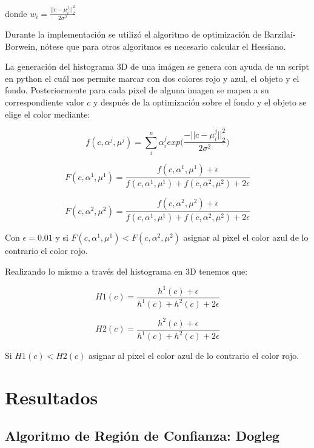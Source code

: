 \documentclass[conference]{IEEEtran}
\begin{document}
donde $w_i = \frac{||c - \mu_i^j||_2^2}{2\sigma^2}$

Durante la implementación se utilizó el algoritmo de optimización de Barzilai-Borwein, nótese que
para otros algoritmos es necesario calcular el Hessiano.

La generación del histograma 3D de una imágen se genera con ayuda de un script en python el cuál nos
permite marcar con dos colores rojo y azul, el objeto y el fondo. Posteriormente para cada pixel de
alguna imagen se mapea a su correspondiente valor $c$ y después de la optimización sobre el fondo y
el objeto se elige el color mediante:

\begin{equation*}
	f(c, \alpha^j, \mu^j) = \sum_i^n \alpha_i^j exp\big( \frac{-||c - \mu_i^j||_2^2}{2\sigma^2} \big)
\end{equation*}

\begin{equation*}
	F(c, \alpha^1, \mu^1) = \frac{f(c, \alpha^1, \mu^1) + \epsilon}
	{f(c, \alpha^1, \mu^1) + f(c, \alpha^2, \mu^2) + 2 \epsilon}
\end{equation*}

\begin{equation*}
	F(c, \alpha^2, \mu^2) = \frac{f(c, \alpha^2, \mu^2) + \epsilon}
	{f(c, \alpha^1, \mu^1) + f(c, \alpha^2, \mu^2) + 2 \epsilon}
\end{equation*}

Con $\epsilon = 0.01$ y si $F(c, \alpha^1, \mu^1) < F(c, \alpha^2, \mu^2)$ asignar al pixel el color
azul de lo contrario el color rojo.

Realizando lo mismo a través del histograma en 3D tenemos que:

\begin{equation*}
	H1(c) = \frac{h^1(c) + \epsilon}
	{h^1(c) + h^2(c) + 2 \epsilon}
\end{equation*}

\begin{equation*}
	H2(c) = \frac{h^2(c) + \epsilon}
	{h^1(c) + h^2(c) + 2 \epsilon}
\end{equation*}

Si $H1(c) < H2(c)$ asignar al pixel el color
azul de lo contrario el color rojo.


\section{Resultados}

\subsection{Algoritmo de Región de Confianza: Dogleg}
\end{document}
